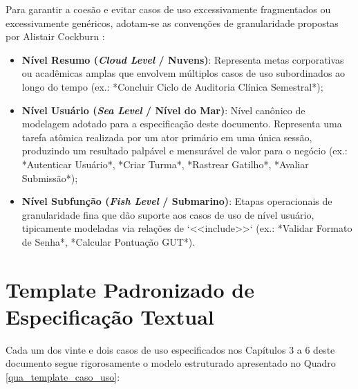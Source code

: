 Para garantir a coesão e evitar casos de uso excessivamente fragmentados ou excessivamente genéricos, adotam-se as convenções de granularidade propostas por Alistair Cockburn \cite{cockburn2000}:
\begin{itemize}
    \item \textbf{Nível Resumo (\textit{Cloud Level} / Nuvens)}: Representa metas corporativas ou acadêmicas amplas que envolvem múltiplos casos de uso subordinados ao longo do tempo (ex.: *Concluir Ciclo de Auditoria Clínica Semestral*);
    \item \textbf{Nível Usuário (\textit{Sea Level} / Nível do Mar)}: Nível canônico de modelagem adotado para a especificação deste documento. Representa uma tarefa atômica realizada por um ator primário em uma única sessão, produzindo um resultado palpável e mensurável de valor para o negócio (ex.: *Autenticar Usuário*, *Criar Turma*, *Rastrear Gatilho*, *Avaliar Submissão*);
    \item \textbf{Nível Subfunção (\textit{Fish Level} / Submarino)}: Etapas operacionais de granularidade fina que dão suporte aos casos de uso de nível usuário, tipicamente modeladas via relações de `<<include>>` (ex.: *Validar Formato de Senha*, *Calcular Pontuação GUT*).
\end{itemize}

\section{Template Padronizado de Especificação Textual}
\label{sec_template_especificacao}

Cada um dos vinte e dois casos de uso especificados nos Capítulos 3 a 6 deste documento segue rigorosamente o modelo estruturado apresentado no Quadro \ref{qua_template_caso_uso}:

